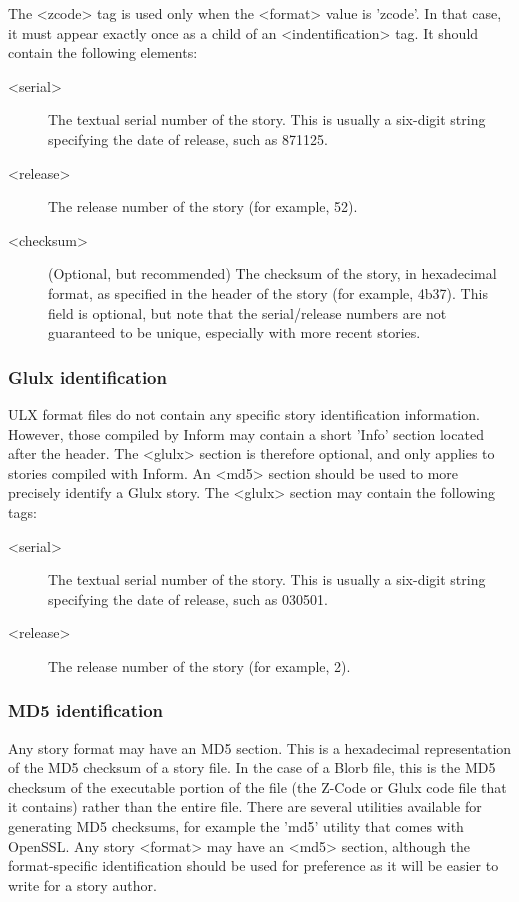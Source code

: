 \documentclass[a4paper,11pt]{article}
\begin{document}
The <zcode> tag is used only when the <format> value is 'zcode'. In that case, it must
appear exactly once as a child of  an <indentification> tag. It should contain the following
elements:

\begin{description}
\item[<serial>] The textual serial number of the story. This is usually a six-digit string
specifying the date of release, such as 871125.
\item[<release>] The release number of the story (for example, 52).
\item[<checksum>] (Optional, but recommended) The checksum of the story, in 
hexadecimal format, as specified in the header of the story (for example, 4b37). This field is 
optional, but note that the serial/release numbers are not guaranteed to be unique, especially 
with more recent stories.
\end{description}

\subsubsection{Glulx identification}

ULX format files do not contain any specific story identification information. However,
those compiled by Inform may contain a short 'Info' section located after the header. The
<glulx> section is therefore optional, and only applies to stories compiled with Inform.
An <md5> section should be used to more precisely identify a Glulx story. The <glulx>
section may contain the following tags:

\begin{description}
\item[<serial>] The textual serial number of the story. This is usually a six-digit string
specifying the date of release, such as 030501.
\item[<release>] The release number of the story (for example, 2).
\end{description}

\subsubsection{MD5 identification}

Any story format may have an MD5 section. This is a hexadecimal representation of the
MD5 checksum of a story file. In the case of a Blorb file, this is the MD5 checksum of
the executable portion of the file (the Z-Code or Glulx code file that it contains) rather
than the entire file. There are several utilities available for generating MD5 checksums,
for example the 'md5' utility that comes with OpenSSL. Any story <format> may have
an <md5> section, although the format-specific identification should be used for preference
as it will be easier to write for a story author.
\end{document}
